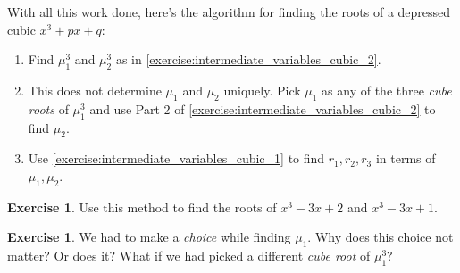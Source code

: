 \documentclass[reqno, 12pt, letter]{article}
\theoremstyle{plain}
\theoremstyle{definition}
\newtheorem{exercise}[theorem]{Exercise}
\theoremstyle{remark}
\numberwithin{equation}{section}
\begin{document}
	\begin{mdframed}
		With all this work done, here's the algorithm for finding the roots of a depressed cubic $ x^3 + px + q$:
		\begin{enumerate}
			\item Find $ \mu_1^3$ and $ \mu_2^3$ as in \autoref{exercise:intermediate_variables_cubic_2}.
			\item This does not determine $ \mu_1$ and $ \mu_2$ uniquely. Pick $ \mu_1$ as any of the three \emph{cube roots} of $ \mu_1^3$ and use Part 2 of \autoref{exercise:intermediate_variables_cubic_2} to find $ \mu_2$.
			\item Use \autoref{exercise:intermediate_variables_cubic_1} to find $ r_1, r_2, r_3$ in terms of $ \mu_1, \mu_2$. 
		\end{enumerate}
	\end{mdframed}
		\begin{exercise}
			Use this method to find the roots of $x^3 - 3x + 2$ and $x^3 - 3x + 1$.
		\end{exercise}
		
	\begin{exercise}
		We had to make a \emph{choice} while finding $ \mu_1$. Why does this choice not matter? Or does it? What if we had picked a different \emph{cube root} of $ \mu_1^3$?
	\end{exercise}
	
\end{document}
